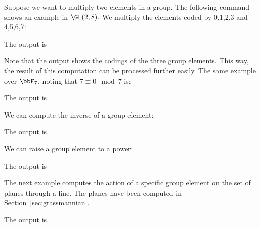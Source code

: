 Suppose we want to multiply two elements in a group. 
The following command shows an example in $\GL(2,8).$ 
We multiply the elements coded by 0,1,2,3 and 4,5,6,7:
{\tt

}
The output is
\begin{mdframed}[style=MyFrame]

\end{mdframed}
Note that the output shows the codings of the three group elements. 
This way, the result of this computation can be processed further easily.
The same example over $\bbF_7$, noting that $7 \equiv 0 \mod 7$ is:
{\tt

}
The output is
\begin{mdframed}[style=MyFrame]

\end{mdframed}
We can compute the inverse of a  group element:
{\tt

}
The output is
\begin{mdframed}[style=MyFrame]

\end{mdframed}
We can raise a group element to a power:
{\tt

}
The output is
\begin{mdframed}[style=MyFrame]

\end{mdframed}

\bigskip


The next example computes the action of a specific group element on the set of planes through a line. 
The planes have been computed in Section~\ref{sec:grassmannian}.
{\tt

}
The output is
\begin{mdframed}[style=MyFrame]

\end{mdframed}

